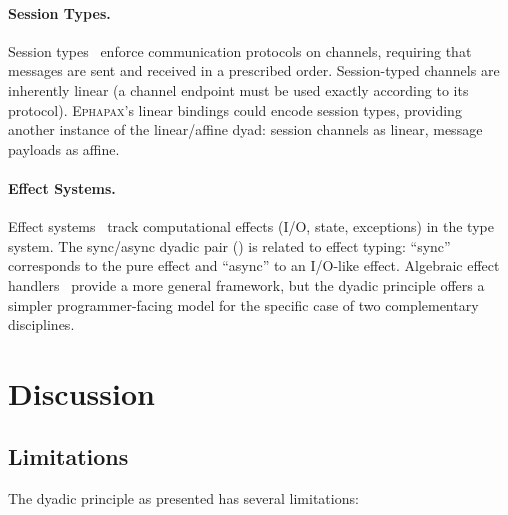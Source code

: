 \documentclass[11pt,a4paper]{article}
\newcommand{\Ephapax}{\textsc{Ephapax}}
\begin{document}
\paragraph{Session Types.}
Session types~\citep{honda1998language} enforce communication protocols on
channels, requiring that messages are sent and received in a prescribed order.
Session-typed channels are inherently linear (a channel endpoint must be used
exactly according to its protocol). \Ephapax{}'s linear bindings could encode
session types, providing another instance of the linear/affine dyad: session
channels as linear, message payloads as affine.

\paragraph{Effect Systems.}
Effect systems~\citep{lucassen1988polymorphic} track computational effects
(I/O, state, exceptions) in the type system. The sync/async dyadic pair
() is related to effect typing: ``sync'' corresponds
to the pure effect and ``async'' to an I/O-like effect. Algebraic effect
handlers~\citep{plotkin2013handling} provide a more general framework, but
the dyadic principle offers a simpler programmer-facing model for the specific
case of two complementary disciplines.

\section{Discussion}
\label{sec:discussion}

\subsection{Limitations}

The dyadic principle as presented has several limitations:
\end{document}
